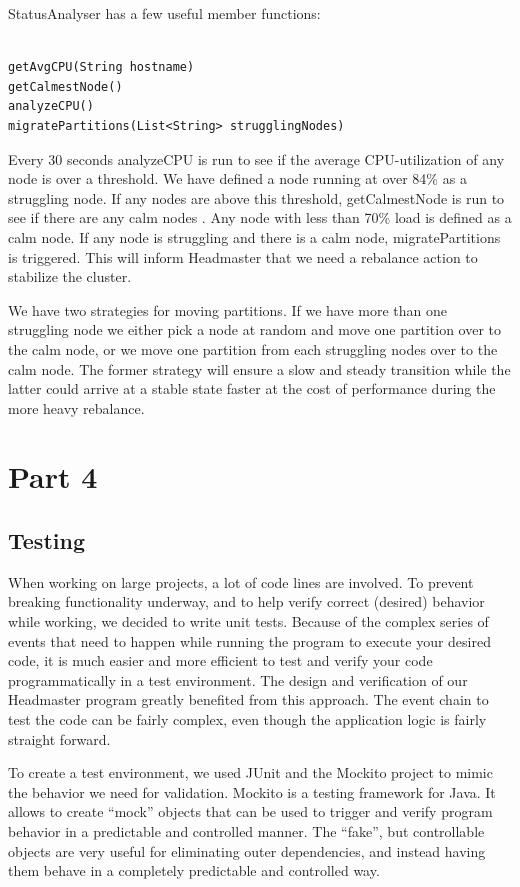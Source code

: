 StatusAnalyser has a few useful member functions:

\begin{lstlisting}[style=customjava,label=lst:test,caption={Helper functions in StatusAnalyzer.}]

getAvgCPU(String hostname)
getCalmestNode()
analyzeCPU()
migratePartitions(List<String> strugglingNodes)

\end{lstlisting}

Every 30 seconds analyzeCPU is run to see if the average CPU-utilization of any node is over a threshold. We have defined a node running at over 84\% as a struggling node. If any nodes are above this threshold, getCalmestNode is run to see if there are any calm nodes . Any node with less than 70\% load is defined as a calm node. If any node is struggling and there is a calm node, migratePartitions is triggered. This will inform Headmaster that we need a rebalance action to stabilize the cluster. 

We have two strategies for moving partitions. If we have more than one struggling node we either pick a node at random and move one partition over to the calm node, or we move one partition from each struggling nodes over to the calm node. The former strategy will ensure a slow and steady transition while the latter could arrive at a stable state faster at the cost of performance during the more heavy rebalance. 

\section{Part 4}
\subsection{Testing}
When working on large projects, a lot of code lines are involved. To prevent breaking functionality underway, and to help verify correct (desired) behavior while working, we decided to write unit tests. 
Because of the complex series of events that need to happen while running the program to execute your desired code, it is much easier and more efficient to test and verify your code programmatically in a test environment. The design and verification of our Headmaster program greatly benefited from this approach. The event chain to test the code can be fairly complex, even though the application logic is fairly straight forward.

To create a test environment, we used JUnit and the Mockito project to mimic the behavior we need for validation.
Mockito is a testing framework for Java. It allows to create ``mock'' objects that can be used to trigger and verify program behavior in a predictable and controlled manner. The ``fake'', but controllable objects are very useful for eliminating outer dependencies, and instead having them behave in a completely predictable and controlled way.

